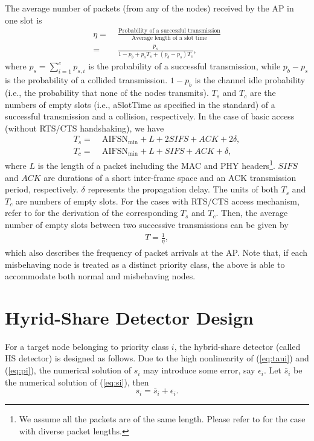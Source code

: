 \documentclass[conference]{IEEEtran}
\begin{document}
The average number of packets (from any of the nodes) received by the AP in one slot is
\begin{align}
\nonumber  \eta =&\; \frac{\textrm{Probability of a successful transmission}}{\textrm{Average length of a slot time}}\\
         =&\; \frac{p_s}{1-p_b+p_sT_s+(p_b-p_s)T_c},
\end{align}
where $p_s=\sum^{c}_{i=1}p_{s,i}$ is the probability of a successful transmission, while $p_b-p_s$ is the probability of a collided transmission. $1-p_b$ is the channel idle probability (i.e., the probability that none of the nodes transmits). $T_s$ and $T_c$ are the numbers of empty slots (i.e., aSlotTime as specified in the standard) of a successful transmission and a collision, respectively. In the case of basic access (without RTS/CTS handshaking), we have \cite{kosek2011simple}
\begin{align}
    T_s =&\; \textrm{AIFSN}_{\min}+L+2SIFS+ACK+2\delta,\\
    T_c =&\; \textrm{AIFSN}_{\min}+L+SIFS+ACK+\delta,
\end{align}
where $L$ is the length of a packet including the MAC and PHY headers\footnote{We assume all the packets are of the same length. Please refer to \cite{bianchi2000performance} for the case with diverse packet lengths.}. $SIFS$ and $ACK$ are durations of a short inter-frame space and an ACK transmission period, respectively. $\delta$ represents the propagation delay. The units of both $T_s$ and $T_c$ are numbers of empty slots. For the cases with RTS/CTS access mechanism, refer to \cite{kosek2011simple} for the derivation of the corresponding $T_s$ and $T_c$. Then, the average number of empty slots between two successive transmissions can be given by
\begin{align}\label{eq:T}
    T = \frac{1}{\eta},
\end{align}
which also describes the frequency of packet arrivals at the AP. Note that, if each misbehaving node is treated as a distinct priority class, the above is able to accommodate both normal and misbehaving nodes.





\section{Hyrid-Share Detector Design}\label{sec:hsdetector}


For a target node belonging to priority class $i$, the hybrid-share detector (called HS detector) is designed as follows. Due to the high nonlinearity of (\ref{eq:taui}) and (\ref{eq:pi}), the numerical solution of $s_i$ may introduce some error, say $\epsilon_i$. Let $\bar{s}_i$ be the numerical solution of (\ref{eq:si}), then
\begin{equation}\label{eq:si}
    s_i=\bar{s}_i+\epsilon_i.
\end{equation}
\end{document}
